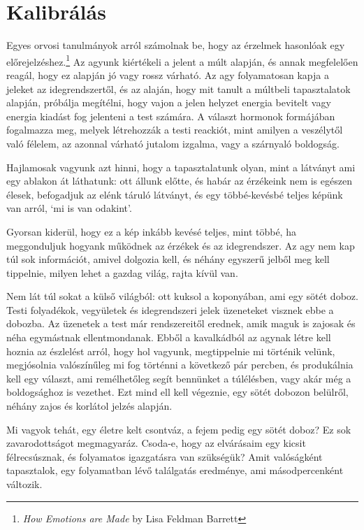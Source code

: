 \section{Kalibrálás}

Egyes orvosi tanulmányok arról számolnak be, hogy az érzelmek hasonlóak
egy előrejelzéshez.\footnote{\emph{How Emotions are Made} by Lisa
  Feldman Barrett} Az agyunk kiértékeli a jelent a múlt alapján, és
annak megfelelően reagál, hogy ez alapján jó vagy rossz várható. Az agy
folyamatosan kapja a jeleket az idegrendszertől, és az alaján, hogy mit
tanult a múltbeli tapasztalatok alapján, próbálja megítélni, hogy vajon
a jelen helyzet energia bevitelt vagy energia kiadást fog jelenteni a
test számára. A választ hormonok formájában fogalmazza meg, melyek
létrehozzák a testi reackiót, mint amilyen a veszélytől való félelem, az
azonnal várható jutalom izgalma, vagy a szárnyaló boldogság.

Hajlamosak vagyunk azt hinni, hogy a tapasztalatunk olyan, mint a
látványt ami egy ablakon át láthatunk: ott állunk előtte, és habár az
érzékeink nem is egészen élesek, befogadjuk az elénk táruló látványt, és
egy többé-kevésbé teljes képünk van arról, `mi is van odakint'.

Gyorsan kiderül, hogy ez a kép inkább kevésé teljes, mint többé, ha
meggonduljuk hogyank működnek az érzékek és az idegrendszer. Az agy nem
kap túl sok információt, amivel dolgozia kell, és néhány egyszerű jelből
meg kell tippelnie, milyen lehet a gazdag világ, rajta kívül van.

Nem lát túl sokat a külső világból: ott kuksol a koponyában, ami egy
sötét doboz. Testi folyadékok, vegyületek és idegrendszeri jelek
üzeneteket visznek ebbe a dobozba. Az üzenetek a test már rendszereitől
erednek, amik maguk is zajosak és néha egymástnak ellentmondanak. Ebből
a kavalkádból az agynak létre kell hoznia az észlelést arról, hogy hol
vagyunk, megtippelnie mi történik velünk, megjósolnia valószínűleg mi
fog történni a következő pár percben, és produkálnia kell egy választ,
ami remélhetőleg segít bennünket a túlélésben, vagy akár még a
boldogsághoz is vezethet. Ezt mind ell kell végeznie, egy sötét dobozon
belülről, néhány zajos és korlátol jelzés alapján.

Mi vagyok tehát, egy életre kelt csontváz, a fejem pedig egy sötét
doboz? Ez sok zavarodottságot megmagyaráz. Csoda-e, hogy az elvárásaim
egy kicsit félrecsúsznak, és folyamatos igazgatásra van szükségük? Amit
valóságként tapasztalok, egy folyamatban lévő találgatás eredménye, ami
másodpercenként változik.

